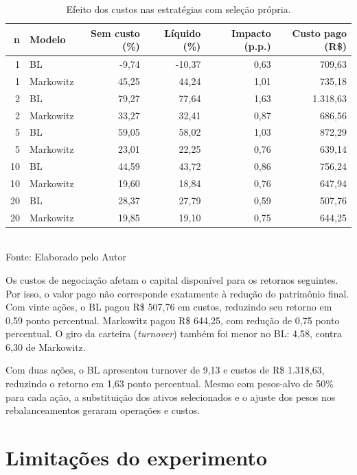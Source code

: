 \begin{table}[H]
\centering
\caption{Efeito dos custos nas estratégias com seleção própria.}
\label{tab:custos}
{\footnotesize
\begin{tabular}{@{}rlrrrr@{}}
\hline
n & Modelo & Sem custo (\%) & Líquido (\%) & Impacto (p.p.) & Custo pago (R\$) \\ \hline
1 & BL & -9,74 & -10,37 & 0,63 & 709,63 \\
1 & Markowitz & 45,25 & 44,24 & 1,01 & 735,18 \\
2 & BL & 79,27 & 77,64 & 1,63 & 1.318,63 \\
2 & Markowitz & 33,27 & 32,41 & 0,87 & 686,56 \\
5 & BL & 59,05 & 58,02 & 1,03 & 872,29 \\
5 & Markowitz & 23,01 & 22,25 & 0,76 & 639,14 \\
10 & BL & 44,59 & 43,72 & 0,86 & 756,24 \\
10 & Markowitz & 19,60 & 18,84 & 0,76 & 647,94 \\
20 & BL & 28,37 & 27,79 & 0,59 & 507,76 \\
20 & Markowitz & 19,85 & 19,10 & 0,75 & 644,25 \\
\hline
\end{tabular}}
\par{}\\
Fonte: Elaborado pelo Autor
\end{table}
Os custos de negociação afetam o capital disponível para
os retornos seguintes. Por isso, o valor pago não corresponde
exatamente à redução do patrimônio final. Com vinte ações,
o BL pagou R\$ 507,76 em custos, reduzindo seu retorno em
0,59 ponto percentual. Markowitz pagou R\$ 644,25, com
redução de 0,75 ponto percentual. O giro da carteira
(\emph{turnover}) também foi menor no BL: 4,58, contra
6,30 de Markowitz.

Com duas ações, o BL apresentou turnover de 9,13 e custos
de R\$ 1.318,63, reduzindo o retorno em 1,63 ponto percentual.
Mesmo com pesos-alvo de 50\% para cada ação, a substituição
dos ativos selecionados e o ajuste dos pesos nos
rebalanceamentos geraram operações e custos.

\section{Limitações do experimento}

